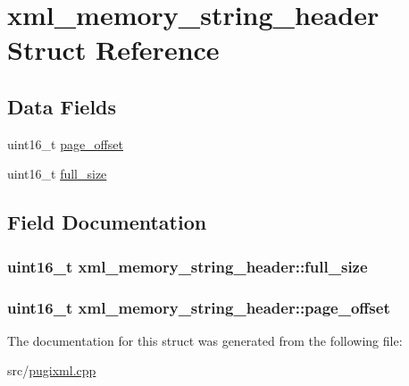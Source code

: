 \hypertarget{structxml__memory__string__header}{
\section{xml\_\-memory\_\-string\_\-header Struct Reference}
\label{structxml__memory__string__header}
}
\subsection*{Data Fields}
\begin{DoxyCompactItemize}
\item 
uint16\_\-t \hyperlink{structxml__memory__string__header_a0cc274672f1263f73eeb6bf839bf96ee}{page\_\-offset}
\item 
uint16\_\-t \hyperlink{structxml__memory__string__header_abbb48a709081e6610dffad322499e3f7}{full\_\-size}
\end{DoxyCompactItemize}


\subsection{Field Documentation}
\hypertarget{structxml__memory__string__header_abbb48a709081e6610dffad322499e3f7}{
\subsubsection[{full\_\-size}]{\setlength{\rightskip}{0pt plus 5cm}uint16\_\-t {\bf xml\_\-memory\_\-string\_\-header::full\_\-size}}}
\label{structxml__memory__string__header_abbb48a709081e6610dffad322499e3f7}
\hypertarget{structxml__memory__string__header_a0cc274672f1263f73eeb6bf839bf96ee}{
\subsubsection[{page\_\-offset}]{\setlength{\rightskip}{0pt plus 5cm}uint16\_\-t {\bf xml\_\-memory\_\-string\_\-header::page\_\-offset}}}
\label{structxml__memory__string__header_a0cc274672f1263f73eeb6bf839bf96ee}


The documentation for this struct was generated from the following file:\begin{DoxyCompactItemize}
\item 
src/\hyperlink{pugixml_8cpp}{pugixml.cpp}\end{DoxyCompactItemize}
